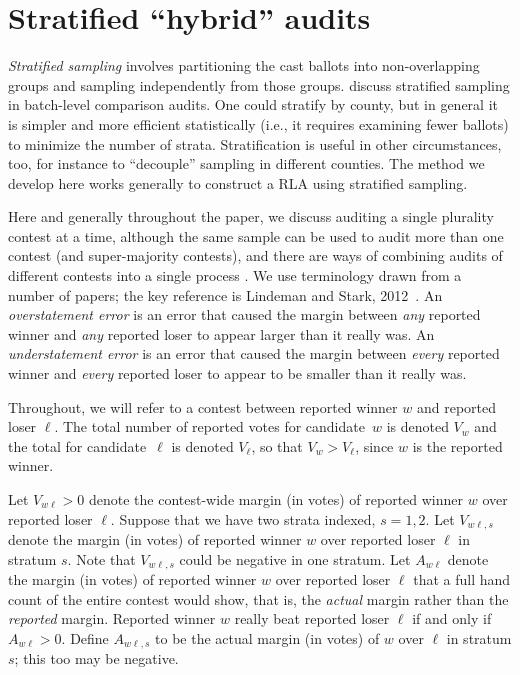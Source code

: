 \documentclass[runningheads]{llncs}
\begin{document}
\section{Stratified ``hybrid'' audits} \label{sec:hybrid}

\emph{Stratified sampling} involves partitioning the cast ballots
into non-overlapping groups and sampling independently from those groups.
\cite{stark08a,higginsEtal11} discuss stratified sampling in batch-level comparison audits.
 One could stratify by county, but in general it is simpler and more efficient
statistically (i.e., it requires examining fewer ballots) to minimize the number of strata.
Stratification is useful in other circumstances, too, for instance to ``decouple'' sampling
in different counties.
The method we develop here works generally to construct a RLA using stratified sampling.

Here and generally throughout the paper, we 
discuss auditing a single plurality contest at a time, although the same sample can be used to audit
more than one contest (and super-majority contests), and there are ways of combining audits of different contests into
a single process \cite{stark09c,stark10d}.
We use terminology drawn from a number of papers; the key reference is Lindeman and Stark, 2012~\cite{lindemanStark12}.
An \emph{overstatement error} is an error that caused the margin between \emph{any} reported
winner and \emph{any} reported loser to appear larger than it really was.
An \emph{understatement error} is an error that caused the margin between \emph{every} reported
winner and \emph{every} reported loser to appear to be smaller than it really was.

Throughout, we will refer to a contest between reported winner $w$ and reported loser $\ell$.
The total number of reported votes for candidate~$w$ is denoted $V_w$ 
and the total for candidate~$\ell$ is denoted $V_\ell$, so that $V_w > V_\ell$, since 
$w$ is the reported winner.

Let $V_{w\ell} > 0$ denote the contest-wide margin (in votes) of reported winner 
$w$ over reported loser $\ell$.
Suppose that we have two strata indexed, $s=1, 2.$
Let $V_{w\ell,s}$ denote the margin (in votes) of reported winner $w$ over reported loser $\ell$
in stratum $s$. 
Note that $V_{w\ell,s}$ could be negative in one stratum.
Let $A_{w\ell}$ denote the margin (in votes)
of reported winner $w$ over reported loser $\ell$ that 
a full hand count of the entire contest would show, that is, the \emph{actual} margin rather
than the \emph{reported} margin.
Reported winner $w$ really beat reported loser $\ell$ if and only if $A_{w\ell} > 0$.
Define $A_{w\ell,s}$ to be the actual margin (in votes) of $w$ over $\ell$ in stratum $s$;
this too may be negative.
\end{document}
